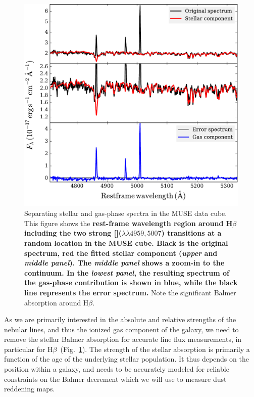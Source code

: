 \documentclass[traditabstract, referee]{aa}
\newcommand{\hb}{H$\beta$}
\newcommand{\oiii}{[\ion{O}{iii}]}
\begin{document}
\begin{figure}
\includegraphics[angle=0, width=0.99\columnwidth]{Figs/Stargas_spec.pdf}
\caption{Separating stellar and gas-phase spectra in the MUSE data cube. This figure shows the \textbf{rest-frame wavelength region around \hb\,including the two strong \oiii($\lambda\lambda4959,5007$) transitions at a random location in the MUSE cube. Black is the original spectrum, red the fitted stellar component (\textit{upper} and \textit{middle panel}). The \textit{middle panel} shows a zoom-in to the continuum. In the \textit{lowest panel}, the resulting spectrum of the gas-phase contribution is shown in blue, while the black line represents the error spectrum.} Note the significant Balmer absorption around \hb.}
\label{fig:stargas}
\end{figure}

As we are primarily interested in the absolute and relative strengths of the nebular lines, and thus the ionized gas component of the galaxy, we need to remove the stellar Balmer absorption for accurate line flux measurements, in particular for \hb\, (Fig.~\ref{fig:stargas}). The strength of the stellar absorption is primarily a function of the age of the underlying stellar population. It thus depends on the position within a galaxy, and needs to be accurately modeled for reliable constraints on the Balmer decrement which we will use to measure dust reddening maps.
\end{document}
